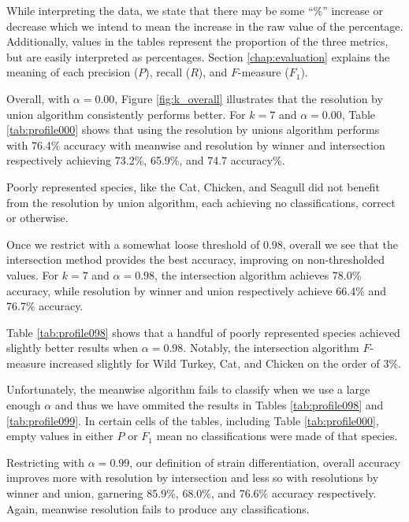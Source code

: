 While interpreting the data, we state that there may be some ``\%'' increase or decrease which we intend to mean the increase in the raw value of the percentage. Additionally, values in the tables represent the proportion of the three metrics, but are easily interpreted as percentages. Section \ref{chap:evaluation} explains the meaning of each precision ($P$), recall ($R$), and $F$-measure ($F_1$).


Overall, with $\alpha=0.00$, Figure \ref{fig:k_overall} illustrates that the resolution by union algorithm consistently performs better. For $k=7$ and $\alpha = 0.00$, Table \ref{tab:profile000} shows that using the resolution by unions algorithm performs with 76.4\% accuracy with meanwise and resolution by winner and intersection respectively achieving 73.2\%, 65.9\%, and 74.7 accuracy\%.

Poorly represented species, like the Cat, Chicken, and Seagull did not benefit from the resolution by union algorithm, each achieving no classifications, correct or otherwise.


Once we restrict with a somewhat loose threshold of 0.98, overall we see that the intersection method provides the best accuracy, improving on non-thresholded values. For $k=7$ and $\alpha=0.98$, the intersection algorithm achieves 78.0\% accuracy, while resolution by winner and union respectively achieve 66.4\% and 76.7\% accuracy.

Table \ref{tab:profile098} shows that a handful of poorly represented species achieved slightly better results when $\alpha=0.98$. Notably, the intersection algorithm $F$-measure increased slightly for Wild Turkey, Cat, and Chicken on the order of 3\%.

Unfortunately, the meanwise algorithm fails to classify when we use a large enough $\alpha$ and thus we have ommited the results in Tables \ref{tab:profile098} and \ref{tab:profile099}. In certain cells of the tables, including Table \ref{tab:profile000}, empty values in either $P$ or $F_1$ mean no classifications were made of that species.




Restricting with $\alpha=0.99$, our definition of strain differentiation, overall accuracy improves more with resolution by intersection and less so with resolutions by winner and union, garnering 85.9\%, 68.0\%, and 76.6\% accuracy respectively. Again, meanwise resolution fails to produce any classifications.

